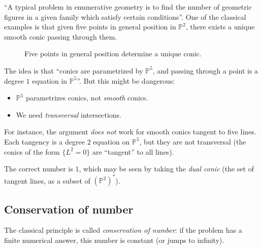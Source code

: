 \documentclass[leqno, openany]{memoir}
\theoremstyle{definition}
\theoremstyle{remark}
\theoremstyle{plain}
\theoremstyle{definition}
\theoremstyle{remark}
\renewcommand{\P}{\mathbb{P}}
\begin{document}
``A typical problem in enumerative geometry is to find the number of geometric figures in a given family which satisfy certain conditions''.  One of the classical examples is that given five points in general position in $\P^2$, there exists a unique smooth conic passing through them. 
\begin{figure}[H]
\centering 
{}
\caption{Five points in general position determine a unique conic.}%
\label{fig:five-points-conic}
\end{figure}

The idea is that ``conics are parametrized by $\P^5$, and passing through a point is a degree $1$ equation in $\P^5$''.  But this might be dangerous:
\begin{itemize}
\item $\P^5$ parametrizes conics, not \emph{smooth} conics.
\item We need \emph{transversal} intersections.
\end{itemize}

For instance, the argument \emph{does not} work for  smooth conics tangent to five lines. Each tangency is a degree $2$ equation on $\P^5$, but they are not transversal (the conics of the form $\{L^2=0\}$ are ``tangent'' to all lines). 

The correct number is $1$, which may be seen by taking the \emph{dual conic} (the set of tangent lines, as a subset of ${ (\P^2) }^\ast$).

\subsection{Conservation of number}%
\label{sub:conservation_of_number}

The classical principle is called \emph{conservation of number}: if the problem has a finite numerical answer, this number is constant (or jumps to infinity).
\end{document}
